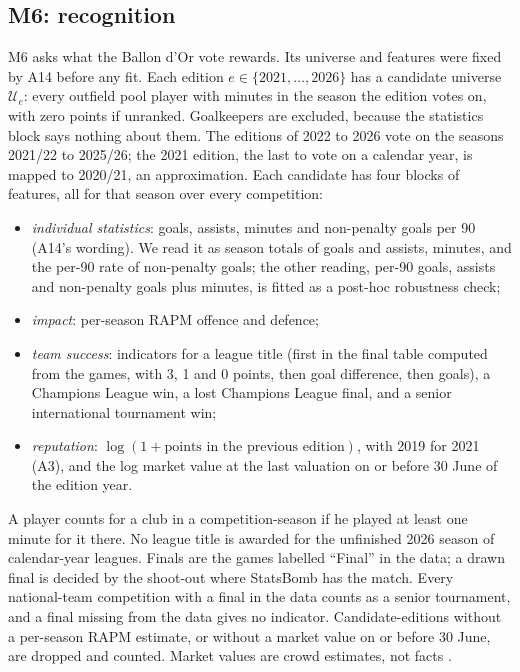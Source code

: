 \documentclass[11pt,a4paper]{article}
\begin{document}
\subsection{M6: recognition}
\label{sec:m6}

M6 asks what the Ballon d'Or vote rewards. Its universe and features were
fixed by A14 before any fit. Each edition $e \in \{2021, \dots, 2026\}$ has a
candidate universe $\mathcal U_e$: every outfield pool player with minutes in the
season the edition votes on, with zero points if unranked. Goalkeepers are
excluded, because the statistics block says nothing about them. The editions
of 2022 to 2026 vote on the seasons 2021/22 to 2025/26; the 2021 edition, the
last to vote on a calendar year, is mapped to 2020/21, an approximation. Each
candidate has four blocks of features, all for that season over every
competition:
\begin{itemize}
  \item \emph{individual statistics}: goals, assists, minutes and non-penalty
    goals per 90 (A14's wording). We read it as season totals of goals and
    assists, minutes, and the per-90 rate of non-penalty goals; the other
    reading, per-90 goals, assists and non-penalty goals plus minutes, is fitted
    as a post-hoc robustness check;
  \item \emph{impact}: per-season RAPM offence and defence;
  \item \emph{team success}: indicators for a league title (first in the final
    table computed from the games, with 3, 1 and 0 points, then goal
    difference, then goals), a Champions League win, a lost Champions League
    final, and a senior international tournament win;
  \item \emph{reputation}: $\log(1 + \text{points in the previous edition})$,
    with 2019 for 2021 (A3), and the log market value at the last valuation on
    or before 30 June of the edition year.
\end{itemize}
A player counts for a club in a competition-season if he played at least one
minute for it there. No league title is awarded for the unfinished 2026 season
of calendar-year leagues. Finals are the games labelled ``Final'' in the data;
a drawn final is decided by the shoot-out where StatsBomb has the match. Every
national-team competition with a final in the data counts as a senior
tournament, and a final missing from the data gives no indicator.
Candidate-editions without a per-season RAPM estimate, or without a market
value on or before 30 June, are dropped and counted. Market values are crowd
estimates, not facts \citep{herm2014crowd}.
\end{document}
